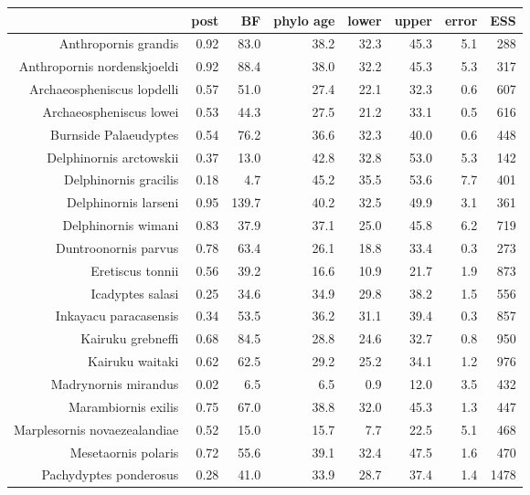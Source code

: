 \begin{table}[ht]
\centering
\begin{tabular}{rrrrrrrr}
  \hline
 & post & BF & phylo age & lower & upper & error & ESS \\ 
  \hline
Anthropornis grandis & 0.92 & 83.0 & 38.2 & 32.3 & 45.3 & 5.1 & 288 \\ 
  Anthropornis nordenskjoeldi & 0.92 & 88.4 & 38.0 & 32.2 & 45.3 & 5.3 & 317 \\ 
  Archaeospheniscus lopdelli & 0.57 & 51.0 & 27.4 & 22.1 & 32.3 & 0.6 & 607 \\ 
  Archaeospheniscus lowei & 0.53 & 44.3 & 27.5 & 21.2 & 33.1 & 0.5 & 616 \\ 
  Burnside Palaeudyptes & 0.54 & 76.2 & 36.6 & 32.3 & 40.0 & 0.6 & 448 \\ 
  Delphinornis arctowskii & 0.37 & 13.0 & 42.8 & 32.8 & 53.0 & 5.3 & 142 \\ 
  Delphinornis gracilis & 0.18 & 4.7 & 45.2 & 35.5 & 53.6 & 7.7 & 401 \\ 
  Delphinornis larseni & 0.95 & 139.7 & 40.2 & 32.5 & 49.9 & 3.1 & 361 \\ 
  Delphinornis wimani & 0.83 & 37.9 & 37.1 & 25.0 & 45.8 & 6.2 & 719 \\ 
  Duntroonornis parvus & 0.78 & 63.4 & 26.1 & 18.8 & 33.4 & 0.3 & 273 \\ 
  Eretiscus tonnii & 0.56 & 39.2 & 16.6 & 10.9 & 21.7 & 1.9 & 873 \\ 
  Icadyptes salasi & 0.25 & 34.6 & 34.9 & 29.8 & 38.2 & 1.5 & 556 \\ 
  Inkayacu paracasensis & 0.34 & 53.5 & 36.2 & 31.1 & 39.4 & 0.3 & 857 \\ 
  Kairuku grebneffi & 0.68 & 84.5 & 28.8 & 24.6 & 32.7 & 0.8 & 950 \\ 
  Kairuku waitaki & 0.62 & 62.5 & 29.2 & 25.2 & 34.1 & 1.2 & 976 \\ 
  Madrynornis mirandus & 0.02 & 6.5 & 6.5 & 0.9 & 12.0 & 3.5 & 432 \\ 
  Marambiornis exilis & 0.75 & 67.0 & 38.8 & 32.0 & 45.3 & 1.3 & 447 \\ 
  Marplesornis novaezealandiae & 0.52 & 15.0 & 15.7 & 7.7 & 22.5 & 5.1 & 468 \\ 
  Mesetaornis polaris & 0.72 & 55.6 & 39.1 & 32.4 & 47.5 & 1.6 & 470 \\ 
  Pachydyptes ponderosus & 0.28 & 41.0 & 33.9 & 28.7 & 37.4 & 1.4 & 1478 \\ 

\end{tabular}
\end{table}

